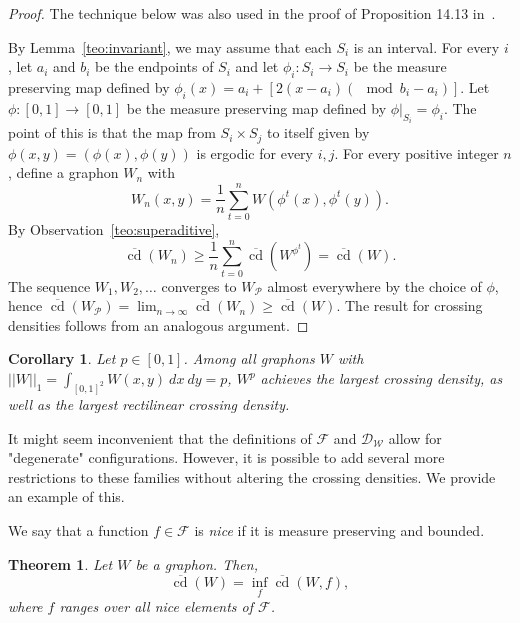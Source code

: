 \documentclass{article}
\newcounter{contSect} \numberwithin{contSect}{section}
\newtheorem{theorem}[contSect]{Theorem}
\newtheorem{corollary}[contSect]{Corollary}
\begin{document}
\begin{proof}
    The technique below was also used in the proof of Proposition 14.13 in~\cite{lovaszlimits}.
    
    By Lemma~\ref{teo:invariant}, we may assume that each $S_i$ is an interval. For every $i$, let $a_i$ and $b_i$ be the endpoints of $S_i$ and let $\phi_i:S_i\rightarrow S_i$ be the measure preserving map defined by $\phi_i(x)=a_i+[2(x-a_i)(\mod b_i-a_i)]$. Let $\phi:[0,1]\rightarrow[0,1]$ be the measure preserving map defined by $\phi|_{S_i}=\phi_i$. The point of this is that the map from $S_i\times S_j$ to itself given by $\phi(x,y)=(\phi(x),\phi(y))$ is ergodic for every $i,j$. For every positive integer $n$, define a graphon $W_n$ with \[W_n(x,y)=\frac{1}{n}\sum_{t=0}^{n}W(\phi^t(x),\phi^t(y)).\] By Observation~\ref{teo:superaditive}, \[\overline{\mathop{\mathrm{cd}}}(W_n)\geq\frac{1}{n}\sum_{t=0}^{n}\overline{\mathop{\mathrm{cd}}}(W^{\phi^t})=\overline{\mathop{\mathrm{cd}}}(W).\] The sequence $W_1,W_2,\dots$ converges to $W_\mathcal{P}$ almost everywhere by the choice of $\phi$, hence $\overline{\mathop{\mathrm{cd}}}(W_\mathcal{P})=\lim_{n\rightarrow\infty}\overline{\mathop{\mathrm{cd}}}(W_n)\geq\overline{\mathop{\mathrm{cd}}}(W)$. The result for crossing densities follows from an analogous argument. 
\end{proof}

\begin{corollary}\label{teo:Wpmax}
    Let $p\in[0,1]$. Among all graphons $W$ with $||W||_1=\int_{[0,1]^2}W(x,y)\ dx\ dy=p$, $W^p$ achieves the largest crossing density, as well as the largest rectilinear crossing density.
\end{corollary} 

It might seem inconvenient that the definitions of $\mathcal{F}$ and $\mathcal{D}_\mathcal{W}$ allow for "degenerate" configurations. However, it is possible to add several more restrictions to these families without altering the crossing densities. We provide an example of this.

We say that a function $f\in\mathcal{F}$ is \textit{nice} if it is measure preserving and bounded.


\begin{theorem}\label{teo:generic}
Let $W$ be a graphon. Then, \[\overline{\mathop{\mathrm{cd}}}(W)=\inf_{f}\overline{\mathop{\mathrm{cd}}}(W,f),\] where $f$ ranges over all nice elements of $\mathcal{F}$.
\end{theorem}
\end{document}
